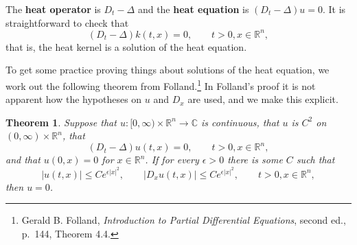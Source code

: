 \documentclass{article}
\newtheorem{theorem}{Theorem}
\begin{document}
The \textbf{heat operator} is $D_t  - \Delta$ and the \textbf{heat equation} is $(D_t - \Delta)u=0$. It is straightforward
to check that 
\[
(D_t -\Delta)k(t,x) = 0, \qquad t>0, x \in \mathbb{R}^n,
\]
that is,  the heat kernel is a solution of the heat equation.

To get some practice proving things about solutions of the heat equation,
we work out the following theorem
from Folland.\footnote{Gerald B. Folland, {\em Introduction to Partial Differential Equations}, second ed., p.~144, Theorem 4.4.}
In Folland's proof it is not apparent how the hypotheses on $u$ and $D_x$ are used, and we make this explicit.

\begin{theorem}
Suppose that
$u:[0,\infty) \times \mathbb{R}^n \to \mathbb{C}$ is continuous, that $u$ is $C^2$ on
$(0,\infty) \times \mathbb{R}^n$,
that
\[
(D_t-\Delta)u(t,x)=0, \qquad t>0, x \in \mathbb{R}^n,
\]
and that $u(0,x)=0$ for $x \in \mathbb{R}^n$. If for every $\epsilon>0$ there is some $C$ such that
\[
|u(t,x)| \leq Ce^{\epsilon|x|^2}, \qquad |D_x u(t,x)| \leq C e^{\epsilon|x|^2}, \qquad t >0, x \in \mathbb{R}^n,
\]
then $u=0$.
\end{theorem}
\end{document}
